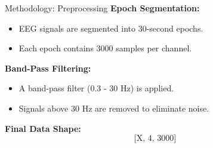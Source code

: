 \begin{frame}{Methodology: Preprocessing}
    \textbf{Epoch Segmentation:}
    \begin{itemize}
        \item EEG signals are segmented into 30-second epochs.
        \item Each epoch contains 3000 samples per channel.
    \end{itemize}

    \vspace{10pt}
    \textbf{Band-Pass Filtering:}
    \begin{itemize}
        \item A band-pass filter (0.3 - 30 Hz) is applied.
        \item Signals above 30 Hz are removed to eliminate noise.
    \end{itemize}

    \vspace{10pt}
    \textbf{Final Data Shape:}  
    \[
    \text{[X, 4, 3000]}  
    \]

    \end{frame}


